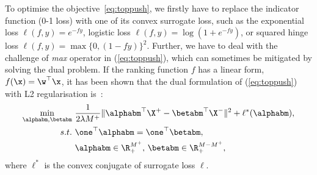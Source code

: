 To optimise the objective~\ref{eq:toppush}, 
we firstly have to replace the indicator function (0-1 loss) with one of its convex surrogate loss,
such as the exponential loss $\ell(f, y) = e^{-fy}$, logistic loss $\ell(f, y) = \log(1 + e^{-fy})$, 
or squared hinge loss $\ell(f, y) = \max\{0, (1 - fy)\}^2$.
Further, we have to deal with the challenge of \emph{max} operator in (\ref{eq:toppush}), which can sometimes be mitigated by solving the dual problem.
If the ranking function $f$ has a linear form, \ie $f(\x) = \w^\top \x$, it has been shown that the dual formulation of (\ref{eq:toppush}) 
with L2 regularisation is~\cite{li2014top}:
\begin{equation*}
\begin{aligned}
\min_{\alphabm, \betabm} \ & \frac{1}{2 \lambda M^+} \| \alphabm^\top \X^+ - \betabm^\top \X^- \|^2 + \ell^*(\alphabm), \\
s.t. \ & \one^\top \alphabm = \one^\top \betabm, \\
       & \alphabm \in \R_+^{M^+}, \, \betabm \in \R_+^{M-M^+},
\end{aligned}
\end{equation*}
where $\ell^*$ is the convex conjugate of surrogate loss $\ell$.


